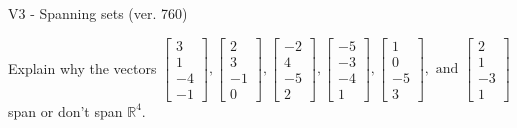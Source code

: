 \begin{exercise}
  \begin{exerciseTitle}V3 - Spanning sets (ver. 760)\end{exerciseTitle}
  \begin{exerciseStatement}
    Explain why the vectors \(\left[\begin{array}{r}
3 \\
1 \\
-4 \\
-1
\end{array}\right] , \left[\begin{array}{r}
2 \\
3 \\
-1 \\
0
\end{array}\right] , \left[\begin{array}{r}
-2 \\
4 \\
-5 \\
2
\end{array}\right] , \left[\begin{array}{r}
-5 \\
-3 \\
-4 \\
1
\end{array}\right] , \left[\begin{array}{r}
1 \\
0 \\
-5 \\
3
\end{array}\right] , \text{ and } \left[\begin{array}{r}
2 \\
1 \\
-3 \\
1
\end{array}\right]\) span or don't span \(\mathbb{R}^4\). 
	



\end{exerciseStatement}
\end{exercise}
